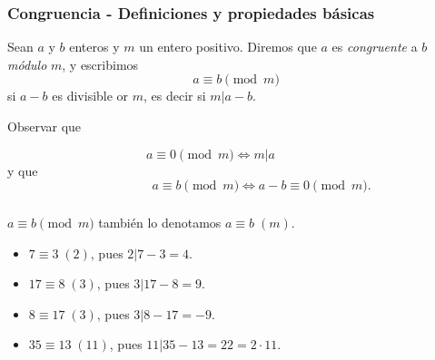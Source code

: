 \documentclass{beamer}
\begin{document}
    \begin{frame}
        \frametitle{Congruencia - Definiciones y propiedades básicas}
    
        \begin{definicion} Sean $a$ y $b$ enteros y $m$ un
            entero positivo. Diremos que $a$ es {\em congruente} a $b$
            {\textit{módulo}} $m$, y escribimos 
            $$
            a \equiv b \pmod{m}
            $$
            si $a-b$ es divisible or $m$,  es decir si $m| a -b$.
        \end{definicion}
        
        Observar que 
        
        $$a\equiv 0 \pmod{m} \Leftrightarrow m|a\qquad\qquad$$ 
        y que 
        $$\qquad\qquad a\equiv b \pmod{m}\Leftrightarrow a-b\equiv 0 \pmod{m}.$$ 
    \end{frame}
    
    \begin{frame}
        \frametitle{}

        \begin{notacion}
            $a \equiv b \pmod{m}$ también  lo denotamos $a \equiv b\; (m)$.

        \end{notacion}

        \begin{ejemplo}
            \begin{itemize}
                \item $7 \equiv 3 \;(2)$, pues $2 | 7-3=4$.
                \item $17 \equiv 8 \;(3)$, pues $3 | 17-8 =9$.  
                \item $8 \equiv 17 \;(3)$, pues $3 | 8-17 =-9$.
                \item $35 \equiv 13 \;(11)$, pues $11| 35-13 = 22 = 2 \cdot 11$. 
            \end{itemize}
        \end{ejemplo}
    
        
    
    \end{frame}

\end{document}
